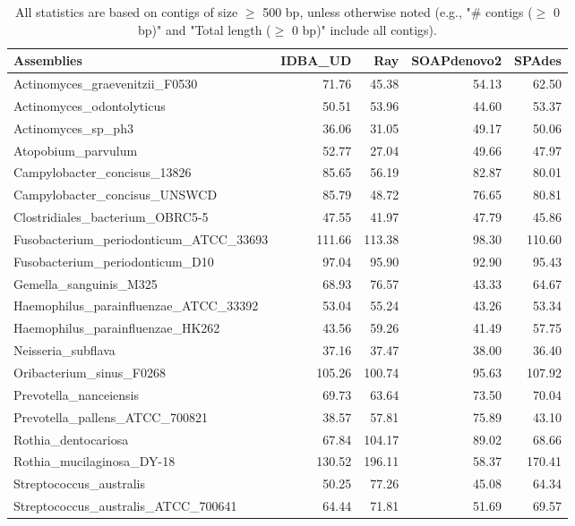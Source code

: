 \documentclass[12pt,a4paper]{article}
\begin{document}
\begin{table}[ht]
\begin{center}
\caption{All statistics are based on contigs of size $\geq$ 500 bp, unless otherwise noted (e.g., "\# contigs ($\geq$ 0 bp)" and "Total length ($\geq$ 0 bp)" include all contigs).}
\begin{tabular}{|l*{4}{|r}|}
\hline
Assemblies & IDBA\_UD & Ray & SOAPdenovo2 & SPAdes \\ \hline
Actinomyces\_graevenitzii\_F0530 & 71.76 & 45.38 & 54.13 & 62.50 \\ \hline
Actinomyces\_odontolyticus & 50.51 & 53.96 & 44.60 & 53.37 \\ \hline
Actinomyces\_sp\_ph3 & 36.06 & 31.05 & 49.17 & 50.06 \\ \hline
Atopobium\_parvulum & 52.77 & 27.04 & 49.66 & 47.97 \\ \hline
Campylobacter\_concisus\_13826 & 85.65 & 56.19 & 82.87 & 80.01 \\ \hline
Campylobacter\_concisus\_UNSWCD & 85.79 & 48.72 & 76.65 & 80.81 \\ \hline
Clostridiales\_bacterium\_OBRC5-5 & 47.55 & 41.97 & 47.79 & 45.86 \\ \hline
Fusobacterium\_periodonticum\_ATCC\_33693 & 111.66 & 113.38 & 98.30 & 110.60 \\ \hline
Fusobacterium\_periodonticum\_D10 & 97.04 & 95.90 & 92.90 & 95.43 \\ \hline
Gemella\_sanguinis\_M325 & 68.93 & 76.57 & 43.33 & 64.67 \\ \hline
Haemophilus\_parainfluenzae\_ATCC\_33392 & 53.04 & 55.24 & 43.26 & 53.34 \\ \hline
Haemophilus\_parainfluenzae\_HK262 & 43.56 & 59.26 & 41.49 & 57.75 \\ \hline
Neisseria\_subflava & 37.16 & 37.47 & 38.00 & 36.40 \\ \hline
Oribacterium\_sinus\_F0268 & 105.26 & 100.74 & 95.63 & 107.92 \\ \hline
Prevotella\_nanceiensis & 69.73 & 63.64 & 73.50 & 70.04 \\ \hline
Prevotella\_pallens\_ATCC\_700821 & 38.57 & 57.81 & 75.89 & 43.10 \\ \hline
Rothia\_dentocariosa & 67.84 & 104.17 & 89.02 & 68.66 \\ \hline
Rothia\_mucilaginosa\_DY-18 & 130.52 & 196.11 & 58.37 & 170.41 \\ \hline
Streptococcus\_australis & 50.25 & 77.26 & 45.08 & 64.34 \\ \hline
Streptococcus\_australis\_ATCC\_700641 & 64.44 & 71.81 & 51.69 & 69.57 \\ \hline

\end{tabular}
\end{center}
\end{table}
\end{document}
